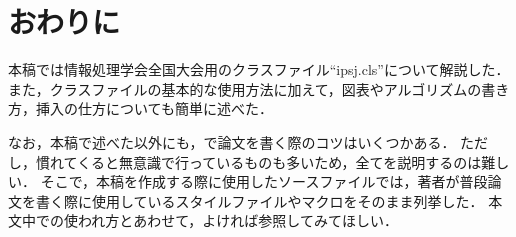 \documentclass{ipsj}
\begin{document}
  
\section{おわりに}
本稿では情報処理学会全国大会用のクラスファイル``ipsj.cls''について解説した．
また，クラスファイルの基本的な使用方法に加えて，図表やアルゴリズムの書き方，挿入の仕方についても簡単に述べた．

なお，本稿で述べた以外にも，{\LaTeXe}で論文を書く際のコツはいくつかある．
ただし，慣れてくると無意識で行っているものも多いため，全てを説明するのは難しい．
そこで，本稿を作成する際に使用したソースファイルでは，著者が普段論文を書く際に使用しているスタイルファイルやマクロをそのまま列挙した．
本文中での使われ方とあわせて，よければ参照してみてほしい．

\small


\end{document}
